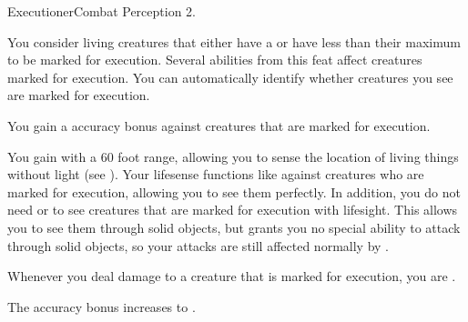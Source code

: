   \begin{feat}{Executioner}{Combat}
    \featpres Perception 2.

     You consider living creatures that either have a  or have less than their maximum  to be marked for execution.
    Several abilities from this feat affect creatures marked for execution.
    You can automatically identify whether creatures you see are marked for execution.

     You gain a  accuracy bonus against creatures that are marked for execution.

     You gain  with a 60 foot range, allowing you to sense the location of living things without light (see ).
    Your lifesense functions like  against creatures who are marked for execution, allowing you to see them perfectly.
    In addition, you do not need  or  to see creatures that are marked for execution with lifesight.
    This allows you to see them through solid objects, but grants you no special ability to attack through solid objects, so your attacks are still affected normally by .

     Whenever you deal damage to a creature that is marked for execution, you are  \empowered.

     The accuracy bonus increases to .
  \end{feat}

